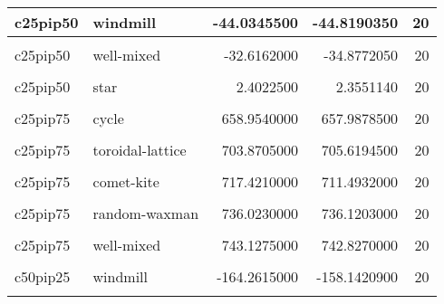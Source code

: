\documentclass[
]{book}
\begin{document}
\begin{table}
\begin{tabular}{l|l|r|r|r}
\hline
c25pip50 & windmill & -44.0345500 & -44.8190350 & 20\\
\hline
\cellcolor{gray!6}{c25pip50} & \cellcolor{gray!6}{toroidal-lattice} & \cellcolor{gray!6}{-34.1670000} & \cellcolor{gray!6}{-36.9710150} & \cellcolor{gray!6}{20}\\
\hline
c25pip50 & well-mixed & -32.6162000 & -34.8772050 & 20\\
\hline
\cellcolor{gray!6}{c25pip50} & \cellcolor{gray!6}{wheel} & \cellcolor{gray!6}{-27.7729000} & \cellcolor{gray!6}{-27.7023650} & \cellcolor{gray!6}{20}\\
\hline
c25pip50 & star & 2.4022500 & 2.3551140 & 20\\
\hline
\cellcolor{gray!6}{c25pip75} & \cellcolor{gray!6}{star} & \cellcolor{gray!6}{140.4695000} & \cellcolor{gray!6}{206.2041715} & \cellcolor{gray!6}{20}\\
\hline
c25pip75 & cycle & 658.9540000 & 657.9878500 & 20\\
\hline
\cellcolor{gray!6}{c25pip75} & \cellcolor{gray!6}{linear-chain} & \cellcolor{gray!6}{664.6090000} & \cellcolor{gray!6}{665.7244000} & \cellcolor{gray!6}{20}\\
\hline
c25pip75 & toroidal-lattice & 703.8705000 & 705.6194500 & 20\\
\hline
\cellcolor{gray!6}{c25pip75} & \cellcolor{gray!6}{wheel} & \cellcolor{gray!6}{715.5445000} & \cellcolor{gray!6}{713.2512500} & \cellcolor{gray!6}{20}\\
\hline
c25pip75 & comet-kite & 717.4210000 & 711.4932000 & 20\\
\hline
\cellcolor{gray!6}{c25pip75} & \cellcolor{gray!6}{windmill} & \cellcolor{gray!6}{720.5355000} & \cellcolor{gray!6}{719.9272500} & \cellcolor{gray!6}{20}\\
\hline
c25pip75 & random-waxman & 736.0230000 & 736.1203000 & 20\\
\hline
\cellcolor{gray!6}{c25pip75} & \cellcolor{gray!6}{random-barabasi-albert} & \cellcolor{gray!6}{739.2250000} & \cellcolor{gray!6}{738.5561500} & \cellcolor{gray!6}{20}\\
\hline
c25pip75 & well-mixed & 743.1275000 & 742.8270000 & 20\\
\hline
\cellcolor{gray!6}{c50pip25} & \cellcolor{gray!6}{well-mixed} & \cellcolor{gray!6}{-198.2860000} & \cellcolor{gray!6}{-179.9309250} & \cellcolor{gray!6}{20}\\
\hline
c50pip25 & windmill & -164.2615000 & -158.1420900 & 20\\
\hline
\cellcolor{gray!6}{c50pip25} & \cellcolor{gray!6}{toroidal-lattice} & \cellcolor{gray!6}{-136.0975000} & \cellcolor{gray!6}{-146.1914300} & \cellcolor{gray!6}{20}\\

\end{tabular}
\end{table}
\end{document}
